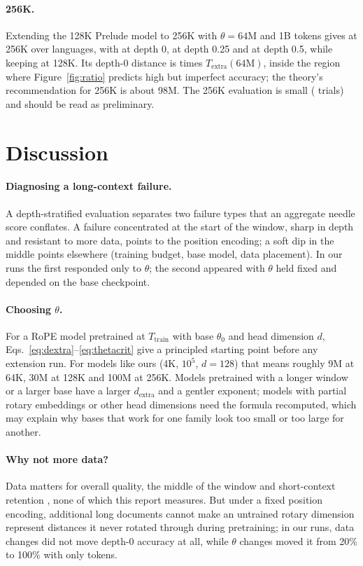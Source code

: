 \documentclass[11pt]{article}
\begin{document}
\paragraph{256K.} Extending the 128K Prelude model to 256K with $\theta=64$M and 1B tokens gives \tfsAll{} at 256K over \tfsLangs{} languages, with \tfsZero{} at depth 0, \tfsQuarter{} at depth 0.25 and \tfsHalf{} at depth 0.5, while keeping \tfsAtOneTwentyEight{} at 128K. Its depth-0 distance is \tfsRatioZero{} times $T_{\mathrm{extra}}(64\text{M})$, inside the region where Figure~\ref{fig:ratio} predicts high but imperfect accuracy; the theory's recommendation for 256K is about 98M. The 256K evaluation is small (\accFracTwoFiftySix{} trials) and should be read as preliminary.

\section{Discussion}
\label{sec:discussion}

\paragraph{Diagnosing a long-context failure.} A depth-stratified evaluation separates two failure types that an aggregate needle score conflates. A failure concentrated at the start of the window, sharp in depth and resistant to more data, points to the position encoding; a soft dip in the middle points elsewhere (training budget, base model, data placement). In our runs the first responded only to $\theta$; the second appeared with $\theta$ held fixed and depended on the base checkpoint.

\paragraph{Choosing $\theta$.} For a RoPE model pretrained at $T_{\mathrm{train}}$ with base $\theta_0$ and head dimension $d$, Eqs.~\ref{eq:dextra}--\ref{eq:thetacrit} give a principled starting point before any extension run. For models like ours (4K, $10^5$, $d{=}128$) that means roughly 9M at 64K, 30M at 128K and 100M at 256K. Models pretrained with a longer window or a larger base have a larger $d_{\mathrm{extra}}$ and a gentler exponent; models with partial rotary embeddings or other head dimensions need the formula recomputed, which may explain why bases that work for one family look too small or too large for another.

\paragraph{Why not more data?} Data matters for overall quality, the middle of the window and short-context retention \citep{fu2024data,gao2025prolong}, none of which this report measures. But under a fixed position encoding, additional long documents cannot make an untrained rotary dimension represent distances it never rotated through during pretraining; in our runs, data changes did not move depth-0 accuracy at all, while $\theta$ changes moved it from 20\% to 100\% with only \sweepTokens{} tokens.
\end{document}
